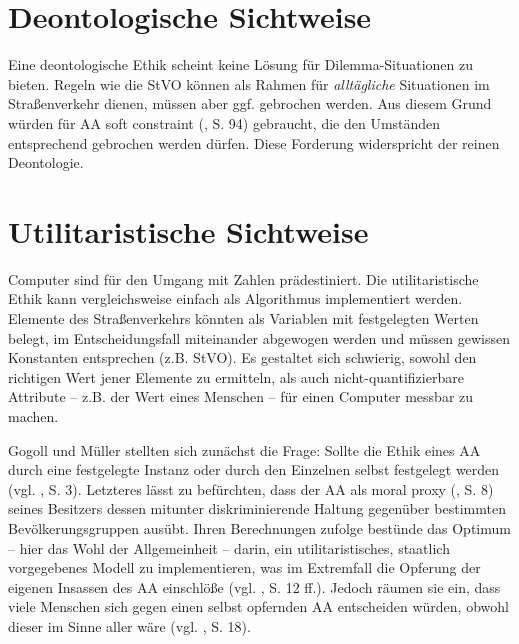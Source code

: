 \documentclass[a4paper, 12pt, titlepage]{scrartcl}
\begin{document}
\section{Deontologische Sichtweise}
	Eine deontologische Ethik scheint keine L\"osung f\"ur Dilemma-Situationen zu bieten. Regeln wie die StVO k\"onnen als Rahmen f\"ur \emph{allt\"agliche} Situationen im Stra\ss enverkehr dienen, m\"ussen aber ggf. gebrochen werden. Aus diesem Grund w\"urden f\"ur AA \glqq soft constraint\grqq{} (\autocite{Gerdes2015}, S. 94) gebraucht, die den Umst\"anden entsprechend gebrochen werden d\"urfen. Diese Forderung widerspricht der reinen Deontologie. 
\section{Utilitaristische Sichtweise}
	Computer sind f\"ur den Umgang mit Zahlen pr\"adestiniert. Die utilitaristische Ethik kann vergleichsweise einfach als Algorithmus implementiert werden. Elemente des Stra\ss enverkehrs k\"onnten als Variablen mit festgelegten Werten belegt, im Entscheidungsfall miteinander abgewogen werden und m\"ussen gewissen Konstanten entsprechen (z.B. StVO). Es gestaltet sich schwierig, sowohl den richtigen Wert jener Elemente zu ermitteln, als auch nicht-quantifizierbare Attribute -- z.B. der \glqq Wert\grqq{} eines Menschen -- f\"ur einen Computer messbar zu machen. 

	
	Gogoll und M\"uller \autocite{Gogoll2016} stellten sich zun\"achst die Frage: Sollte die Ethik eines AA durch eine festgelegte Instanz oder durch den Einzelnen selbst festgelegt werden (vgl. \autocite{Gogoll2016}, S. 3). Letzteres l\"asst zu bef\"urchten, dass der AA als \glqq moral proxy\grqq{} (\autocite{Gogoll2016}, S. 8) seines Besitzers dessen mitunter diskriminierende Haltung gegen\"uber bestimmten Bev\"olkerungsgruppen aus\"ubt. Ihren Berechnungen zufolge best\"unde das Optimum -- hier das Wohl der Allgemeinheit -- darin, ein utilitaristisches, staatlich vorgegebenes Modell zu implementieren, was im Extremfall die Opferung der eigenen Insassen des AA einschl\"o\ss e (vgl. \autocite{Gogoll2016}, S. 12 ff.). Jedoch r\"aumen sie ein, dass viele Menschen sich gegen einen selbst opfernden AA entscheiden w\"urden, obwohl dieser im Sinne aller w\"are (vgl. \autocite{Gogoll2016}, S. 18). 
	
\end{document}
